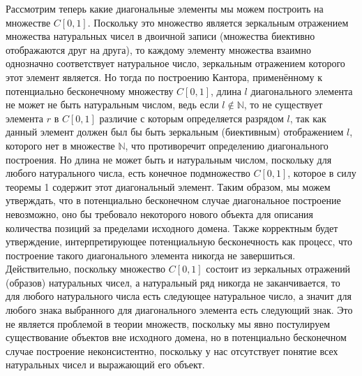 \documentclass[12pt]{article}
\begin{document}
Рассмотрим теперь какие диагональные элементы мы можем построить на множестве $C[0, 1]$. Поскольку это множество является зеркальным отражением множества натуральных чисел в двоичной записи (множества биективно отображаются друг на друга), то каждому элементу множества взаимно однозначно соответствует натуральное число, зеркальным отражением которого этот элемент является. Но тогда по построению Кантора, применённому к потенциально бесконечному множеству $C[0, 1]$, длина $l$ диагонального элемента не может не быть натуральным числом, ведь если $l \notin \mathbb{N}$, то не существует элемента $r$ в $C[0, 1]$ различие с которым определяется разрядом $l$, так как данный элемент должен был бы быть зеркальным (биективным) отображением $l$, которого нет в множестве $\mathbb{N}$, что противоречит определению диагонального построения. Но длина не может быть и натуральным числом, поскольку для любого натурального числа, есть конечное подмножество $C[0, 1]$, которое в силу теоремы 1 содержит этот диагональный элемент. Таким образом, мы можем утверждать, что в потенциально бесконечном случае диагональное построение невозможно, оно бы требовало некоторого нового объекта для описания количества позиций за пределами исходного домена. Также корректным будет утверждение, интерпретирующее потенциальную бесконечность как процесс, что построение такого диагонального элемента никогда не завершиться. Действительно, поскольку множество $C[0, 1]$ состоит из зеркальных отражений (образов) натуральных чисел, а натуральный ряд никогда не заканчивается, то для любого натурального числа есть следующее натуральное число, а значит для любого знака выбранного для диагонального элемента есть следующий знак. Это не является проблемой в теории множеств, поскольку мы явно постулируем существование объектов вне исходного домена, но в потенциально бесконечном случае построение неконсистентно, поскольку у нас отсутствует понятие всех натуральных чисел и выражающий его объект.
\end{document}
